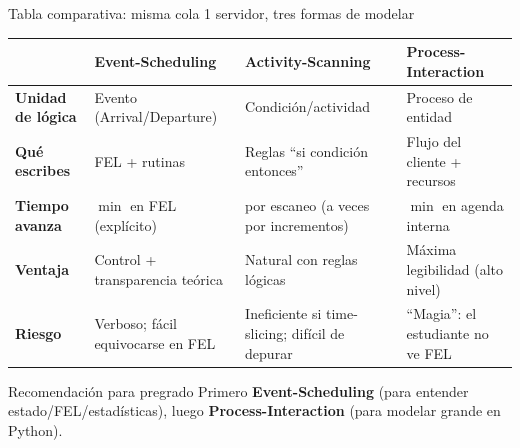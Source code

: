 \documentclass[aspectratio=1610, 9pt]{beamer}
\begin{document}
\begin{frame}{Tabla comparativa: misma cola 1 servidor, tres formas de modelar}
\small
\renewcommand{\arraystretch}{1.25}
\setlength{\tabcolsep}{5pt}
\begin{table}
\centering
\footnotesize
\begin{tabular}{@{}p{} p{} p{} p{}@{}}
\toprule
 & \textbf{Event-Scheduling} & \textbf{Activity-Scanning} & \textbf{Process-Interaction}\\
\midrule
\textbf{Unidad de lógica} & Evento (Arrival/Departure) & Condición/actividad & Proceso de entidad\\
\textbf{Qué escribes} & FEL + rutinas & Reglas “si condición entonces” & Flujo del cliente + recursos\\
\textbf{Tiempo avanza} & $\min$ en FEL (explícito) & por escaneo (a veces por incrementos) & $\min$ en agenda interna\\
\textbf{Ventaja} & Control + transparencia teórica & Natural con reglas lógicas & Máxima legibilidad (alto nivel)\\
\textbf{Riesgo} & Verboso; fácil equivocarse en FEL & Ineficiente si time-slicing; difícil de depurar & “Magia”: el estudiante no ve FEL\\
\bottomrule
\end{tabular}
\end{table}

\vspace{2pt}
\begin{alertblock}{Recomendación para pregrado}
Primero \textbf{Event-Scheduling} (para entender estado/FEL/estadísticas), luego \textbf{Process-Interaction} (para modelar grande en Python).
\end{alertblock}
\end{frame}
\end{document}
